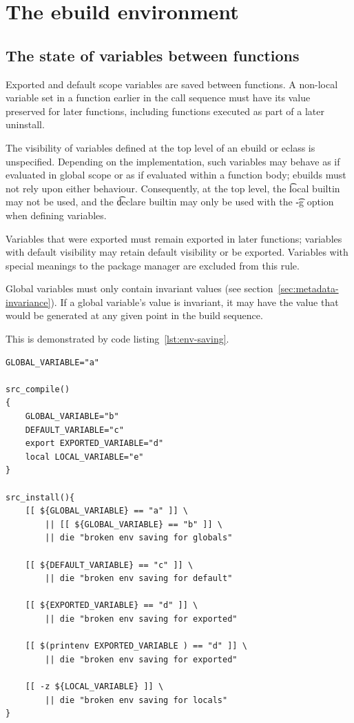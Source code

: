 \chapter{The ebuild environment}



\section{The state of variables between functions}
\label{sec:ebuild-env-state}

Exported and default scope variables are saved between functions. A non-local variable set in a
function earlier in the call sequence must have its value preserved for later functions, including
functions executed as part of a later uninstall.


The visibility of variables defined at the top level of an ebuild or eclass is unspecified.
Depending on the implementation, such variables may behave as if evaluated in global scope or as if
evaluated within a function body; ebuilds must not rely upon either behaviour. Consequently, at the
top level, the \t{local} builtin may not be used, and the \t{declare} builtin may only be used with
the \t{-g} option when defining variables.

Variables that were exported must remain exported in later functions; variables with default
visibility may retain default visibility or be exported. Variables with special meanings to the
package manager are excluded from this rule.

Global variables must only contain invariant values (see section~\ref{sec:metadata-invariance}).
If a global variable's value is invariant, it may have the value that would be generated at any
given point in the build sequence.

This is demonstrated by code listing~\ref{lst:env-saving}.

\begin{listing}
\caption{Environment state between functions} \label{lst:env-saving}
\begin{verbatim}
GLOBAL_VARIABLE="a"

src_compile()
{
    GLOBAL_VARIABLE="b"
    DEFAULT_VARIABLE="c"
    export EXPORTED_VARIABLE="d"
    local LOCAL_VARIABLE="e"
}

src_install(){
    [[ ${GLOBAL_VARIABLE} == "a" ]] \
        || [[ ${GLOBAL_VARIABLE} == "b" ]] \
        || die "broken env saving for globals"

    [[ ${DEFAULT_VARIABLE} == "c" ]] \
        || die "broken env saving for default"

    [[ ${EXPORTED_VARIABLE} == "d" ]] \
        || die "broken env saving for exported"

    [[ $(printenv EXPORTED_VARIABLE ) == "d" ]] \
        || die "broken env saving for exported"

    [[ -z ${LOCAL_VARIABLE} ]] \
        || die "broken env saving for locals"
}
\end{verbatim}
\end{listing}

